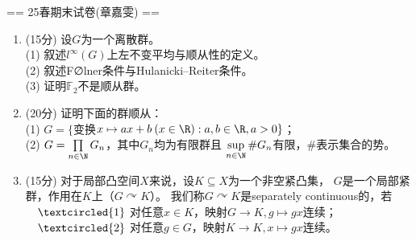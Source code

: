 
== 25春期末试卷(章嘉雯) ==
\begin{enumerate}
    \item[一] (15分) 设$G$为一个离散群。\\
    (1) 叙述$l^\infty(G)$上左不变平均与顺从性的定义。\\
    (2) 叙述F∅lner条件与Hulanicki--Reiter条件。\\
    (3) 证明$\mathbb{F}_2$不是顺从群。
    \item[二] (20分) 证明下面的群顺从：\\
    (1) $G=\{\!$变换$x\mapsto ax+b\:(x\in\R):a,b\in\R,a>0\}$；\\
    (2) $G=\prod\limits_{n\in\N}G_n$，其中$G_n$均为有限群且
    $\sup\limits_{n\in\N}\#G_n$有限，$\#$表示集合的势。
    \item[三] (15分) 对于局部凸空间$X$来说，设$K \subseteq X$为一个非空紧凸集，
    $G$是一个局部紧群，作用在$K$上（$G \curvearrowright K$）。
    我们称$G \curvearrowright K$是separately continuous的，若\\
    $\quad\textcircled{1}$ 对任意$x \in K$，映射$G \to K,g \mapsto gx$连续；\\
    $\quad\textcircled{2}$ 对任意$g \in G$，映射$K \to K,x \mapsto gx$连续。
    

\end{enumerate}

